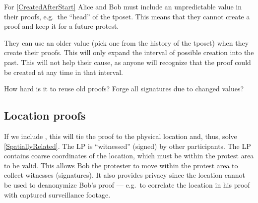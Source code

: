 For \cref{CreatedAfterStart} Alice and Bob must include an unpredictable value 
in their proofs, e.g.\ the \enquote{head} of the \ac{tposet}.
This means that they cannot create a proof and keep it for a future protest.

They can use an older value (pick one from the history of the \ac{tposet}) when 
they create their proofs.
This will only expand the interval of possible creation into the past.
This will not help their cause, as anyone will recognize that the proof could 
be created at any time in that interval.

\begin{frame}

  \pause

  \begin{question}
    How hard is it to reuse old proofs?
    Forge all signatures due to changed values?
  \end{question}
\end{frame}

\subsection{Location proofs}

If we include , this will tie the proof to the physical location and, 
thus, solve \cref{SpatiallyRelated}.
The \ac{LP} is \enquote{witnessed} (signed) by other participants.
The \ac{LP} contains coarse coordinates of the location, which must be within 
the protest area to be valid.
This allows Bob the protester to move within the protest area to collect 
witnesses (signatures).
It also provides privacy since the location cannot be used to deanonymize Bob's 
proof --- e.g.\ to correlate the location in his proof with captured 
surveillance footage.

